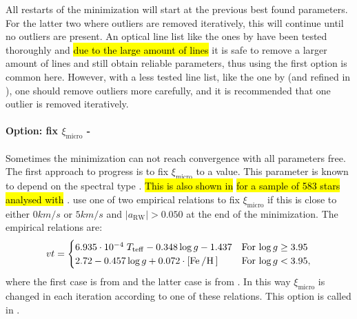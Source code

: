 All restarts of the minimization will start at the previous best found parameters. For the latter
two where outliers are removed iteratively, this will continue until no outliers are present. An
optical line list like the ones by \citet{Sousa2008a,Tsantaki2013} have been tested thoroughly and
\hl{due to the large amount of lines} it is safe to remove a larger amount of lines and still obtain
reliable parameters, thus using the first option is common here. However, with a less tested line
list, like the one by \citet{Andreasen2016} (and refined in \citet{Andreasen2017b}), one should
remove outliers more carefully, and it is recommended that one outlier is removed iteratively.

\paragraph{Option: fix $\xi_\mathrm{micro}$ - }

Sometimes the minimization can not reach convergence with all parameters free. The first approach to
progress is to fix $\xi_\mathrm{micro}$ to a value. This parameter is known to depend on the
spectral type \citep[see e.g.][and references therein]{Tsantaki2013}. \hl{This is also shown in}
 \hl{for a sample of 583 stars analysed with} .  use
one of two empirical relations to fix $\xi_\mathrm{micro}$ if this is close to either $0\si{km/s}$
or $5\si{km/s}$ and $|a_\mathrm{RW}| > 0.050$ at the end of the minimization. The empirical
relations are:
\begin{align}
  vt =
  \begin{cases}
    6.935 \cdot 10^{-4}\; T_\mathrm{teff} - 0.348 \log g - 1.437     & \text{For $\log g \ge 3.95$} \\
    2.72 - 0.457 \log g + 0.072 \cdot [\ion{Fe}/\ion{H}]             & \text{For $\log g < 3.95$},
  \end{cases}
\end{align}
where the first case is from \citet{Tsantaki2013} and the latter case is from \citet{Adibekyan2015}.
In this way $\xi_\mathrm{micro}$ is changed in each iteration according to one of these relations.
This option is called  in .

